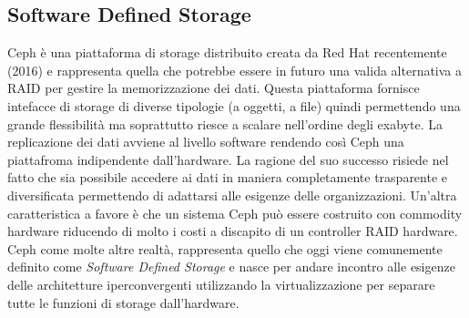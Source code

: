 \subsection{Software Defined Storage}
Ceph è una piattaforma di storage distribuito creata da Red Hat recentemente (2016) e rappresenta quella che potrebbe essere in futuro una valida alternativa a RAID per gestire la memorizzazione dei dati. Questa piattaforma fornisce intefacce di storage di diverse tipologie (a oggetti, a file) quindi permettendo una grande flessibilità ma soprattutto riesce a scalare nell'ordine degli exabyte. La replicazione dei dati avviene al livello software rendendo così Ceph una piattafroma indipendente dall'hardware. La ragione del suo successo risiede nel fatto che sia possibile accedere ai dati in maniera completamente trasparente e diversificata permettendo di adattarsi alle esigenze delle organizzazioni. Un'altra caratteristica a favore è che un sistema Ceph può essere costruito con commodity hardware riducendo di molto i costi a discapito di un controller RAID hardware. Ceph come molte altre realtà, rappresenta quello che oggi viene comunemente definito come \textit{Software Defined Storage} e nasce per andare incontro alle esigenze delle architetture iperconvergenti utilizzando la virtualizzazione per separare tutte le funzioni di storage dall'hardware.
